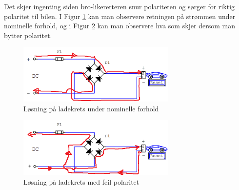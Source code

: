 \begin{solution}[name=Løsningsforslag oppgave]
Det skjer ingenting siden bro-likeretteren snur polariteten og sørger for riktig polaritet til bilen. I Figur \ref{fig:BroLadingSol} kan man observere retningen på strømmen under nominelle forhold, og i Figur \ref{fig:BroLadingSol2} kan man observere hva som skjer dersom man bytter polaritet.

\begin{figure}[H]
	\centering
	\includegraphics[width=0.7\textwidth]{diode/figurer/GretzLadingVanlig-SOL.png}
	\caption{Løsning på ladekrets under nominelle forhold}
	\label{fig:BroLadingSol}
\end{figure}
	
\begin{figure}[H]
	\centering
	\includegraphics[width=0.7\textwidth]{diode/figurer/GretzLadingFeil-SOL.png}
	\caption{Løsning på ladekrets med feil polaritet}
	\label{fig:BroLadingSol2}
\end{figure}	
	
	
\end{solution}





\vspace{0.5cm} %

